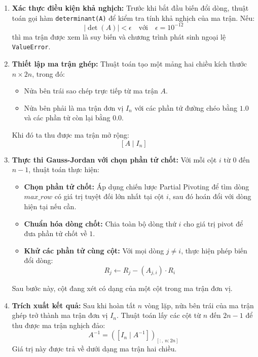 \documentclass[12pt,a4paper]{article}
\begin{document}
\begin{enumerate}[label=\textbf{\alph*) Bước \arabic*:}, leftmargin=*, align=left]
\item \textbf{Xác thực điều kiện khả nghịch:}
Trước khi bắt đầu biến đổi dòng, thuật toán gọi hàm \texttt{determinant(A)} để kiểm tra tính khả nghịch của ma trận. Nếu:
\begin{equation}
|\det(A)| < \epsilon \quad \text{với} \quad \epsilon = 10^{-12}
\end{equation}
thì ma trận được xem là suy biến và chương trình phát sinh ngoại lệ \texttt{ValueError}.

\item \textbf{Thiết lập ma trận ghép:}
Thuật toán tạo một mảng hai chiều kích thước $n \times 2n$, trong đó:
\begin{itemize}[leftmargin=1.5em]
    \item Nửa bên trái sao chép trực tiếp từ ma trận $A$.
    \item Nửa bên phải là ma trận đơn vị $I_n$ với các phần tử đường chéo bằng $1.0$ và các phần tử còn lại bằng $0.0$.
\end{itemize}
Khi đó ta thu được ma trận mở rộng:
\begin{equation}
\left[A \mid I_n\right]
\end{equation}

\item \textbf{Thực thi Gauss-Jordan với chọn phần tử chốt:}
Với mỗi cột $i$ từ $0$ đến $n-1$, thuật toán thực hiện:
\begin{itemize}[leftmargin=1.5em]
    \item \textbf{Chọn phần tử chốt:} Áp dụng chiến lược Partial Pivoting để tìm dòng $max\_row$ có giá trị tuyệt đối lớn nhất tại cột $i$, sau đó hoán đổi với dòng hiện tại nếu cần.
    \item \textbf{Chuẩn hóa dòng chốt:} Chia toàn bộ dòng thứ $i$ cho giá trị pivot để đưa phần tử chốt về $1$.
    \item \textbf{Khử các phần tử cùng cột:} Với mọi dòng $j \ne i$, thực hiện phép biến đổi dòng:
    \begin{equation}
    R_j \leftarrow R_j - (A_{j,i}) \cdot R_i
    \end{equation}
\end{itemize}
Sau bước này, cột đang xét có dạng của một cột trong ma trận đơn vị.

\item \textbf{Trích xuất kết quả:}
Sau khi hoàn tất $n$ vòng lặp, nửa bên trái của ma trận ghép trở thành ma trận đơn vị $I_n$. Thuật toán lấy các cột từ $n$ đến $2n-1$ để thu được ma trận nghịch đảo:
\begin{equation}
A^{-1} = \left( [I_n \mid A^{-1}] \right)_{[:,\,n:2n]}
\end{equation}
Giá trị này được trả về dưới dạng ma trận hai chiều.
\end{enumerate}
\end{document}
